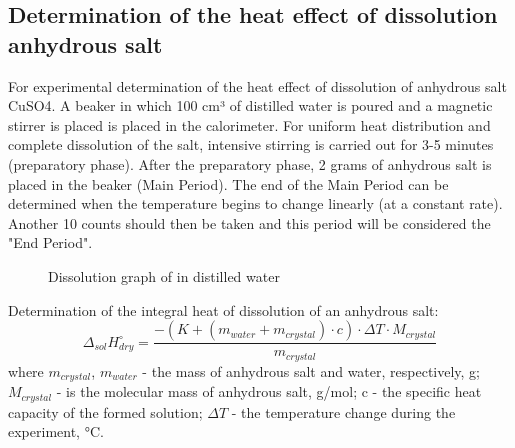 \documentclass[12pt, letterpaper]{article}
\begin{document}
        \subsection*{Determination of the heat effect of dissolution
anhydrous salt}
        \hspace{4mm} For experimental determination of the heat effect of dissolution of anhydrous salt CuSO4. A beaker in which 100 cm³ of distilled water is poured and a magnetic stirrer is placed is placed in the calorimeter. For uniform heat distribution and complete dissolution of the salt, intensive stirring is carried out for 3-5 minutes (preparatory phase). After the preparatory phase, 2 grams of anhydrous salt is placed in the beaker (Main Period). The end of the Main Period can be determined when the temperature begins to change linearly (at a constant rate). Another 10 counts should then be taken and this period will be considered the "End Period".
        \begin{figure}[h]
            \centering
            \caption{Dissolution graph of  in distilled water}
        \end{figure}
        Determination of the integral heat of dissolution of an anhydrous salt: 
        \begin{equation}
            \Delta_{sol}H^\circ_{dry} = \frac{-(K + (m_{water} + m_{crystal}) \cdot c) \cdot \Delta T \cdot M_{crystal}}{m_{crystal}}
        \end{equation}
        where $ m_{crystal}$, $m_{water}$ - the mass of anhydrous salt and water, respectively, g; $M_{crystal}$ - is the molecular mass of anhydrous salt, g/mol; c - the specific heat capacity of the formed solution; $\Delta T$ - the temperature change during the experiment, °C. \\
\end{document}

